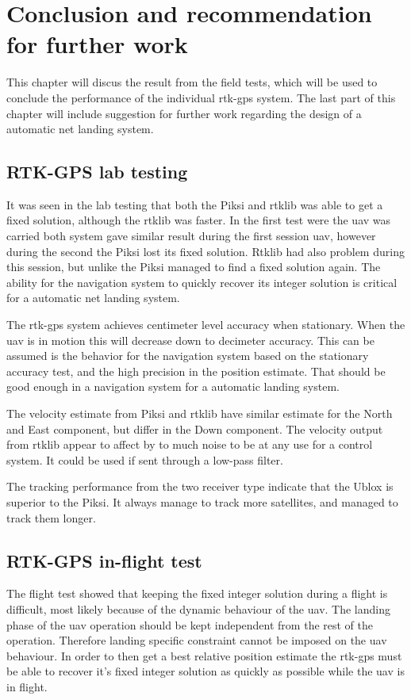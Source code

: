 
\chapter{Conclusion and recommendation for further work}
This chapter will discus the result from the field tests, which will be used to conclude the performance of the individual \gls{rtk-gps} system. The last part of this chapter will include suggestion for further work regarding the design of a automatic net landing system.
\section{RTK-GPS lab testing}
It was seen in the lab testing that both the Piksi and \gls{rtklib} was able to get a fixed solution, although the \gls{rtklib} was faster. In the first test were the \gls{uav} was carried both system gave similar result during the first session \gls{uav}, however during the second the Piksi lost its fixed solution. Rtklib had also problem during this session, but unlike the Piksi managed to find a fixed solution again. The ability for the navigation system to quickly recover its integer solution is critical for a automatic net landing system.

The \gls{rtk-gps} system achieves centimeter level accuracy when stationary. When the \gls{uav} is in motion this will decrease down to decimeter accuracy. This can be assumed is the behavior for the navigation system based on the stationary accuracy test, and the high precision in the position estimate. That should be good enough in a navigation system for a automatic landing system.

The velocity estimate from Piksi and \gls{rtklib} have similar estimate for the North and East component, but differ in the Down component. The velocity output from \gls{rtklib} appear to affect by to much noise to be at any use for a control system. It could be used if sent through a low-pass filter.

The tracking performance from the two receiver type indicate that the Ublox is superior to the Piksi. It always manage to track more satellites, and managed to track them longer.
\section{RTK-GPS in-flight test}
The flight test showed that keeping the fixed integer solution during a flight is difficult, most likely because of the dynamic behaviour of the \gls{uav}. The landing phase of the \gls{uav} operation should be kept independent from the rest of the operation. Therefore landing specific constraint cannot be imposed on the \gls{uav} behaviour. In order to then get a best relative position estimate the \gls{rtk-gps} must be able to recover it's fixed integer solution as quickly as possible while the \gls{uav} is in flight.

